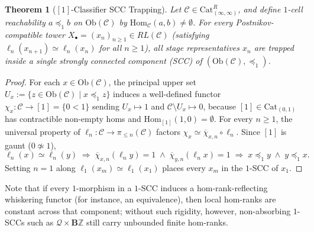 \documentclass[10pt,twoside,openright]{book}
\theoremstyle{crmplain}
\newtheorem{theorem}{Theorem}[section]
\theoremstyle{crmdef}
\theoremstyle{crmremark}
\newcommand{\lean}[1]{\ignorespaces}
\newcommand{\leanwitness}{\ignorespaces}
\begin{document}
\begin{theorem}[{$[1]$}-Classifier SCC Trapping]\label{thm:classifier-scc-trapping}%
\lean{HomotopyCRM.theorem12B_classifier_scc_trapping, HomotopyCRM.theorem12B_tower_trapped_in_single_scc}%
\leanwitness%
%
Let $\mathcal{C} \in \mathrm{Cat}^R_{(\infty, \infty)}$, and define $1$-cell reachability $a \preceq_1 b$ on $\mathrm{Ob}(\mathcal{C})$ by $\mathrm{Hom}_{\mathcal{C}}(a, b) \neq \emptyset$. For every Postnikov-compatible tower $X_\bullet = (x_n)_{n \ge 1} \in RL(\mathcal{C})$ (satisfying $\ell_n(x_{n+1}) \simeq \ell_n(x_n)$ for all $n \ge 1$), all stage representatives $x_n$ are trapped inside a single strongly connected component (SCC) of $(\mathrm{Ob}(\mathcal{C}), \preceq_1)$.
\end{theorem}

\begin{proof}
For each $x \in \mathrm{Ob}(\mathcal{C})$, the principal upper set $U_x := \{z \in \mathrm{Ob}(\mathcal{C}) \mid x \preceq_1 z\}$ induces a well-defined functor $\chi_x : \mathcal{C} \to [1] = \{0 < 1\}$ sending $U_x \mapsto 1$ and $\mathcal{C} \setminus U_x \mapsto 0$, because $[1] \in \mathrm{Cat}_{(0,1)}$ has contractible non-empty homs and $\mathrm{Hom}_{[1]}(1, 0) = \emptyset$. For every $n \ge 1$, the universal property of $\ell_n : \mathcal{C} \to \pi_{\le n}(\mathcal{C})$ factors $\chi_x \simeq \overline{\chi}_{x,n} \circ \ell_n$. Since $[1]$ is gaunt ($0 \not\simeq 1$),
\[
  \ell_n(x) \simeq \ell_n(y) \;\Longrightarrow\; \overline{\chi}_{x,n}(\ell_n y) = 1 \;\wedge\; \overline{\chi}_{y,n}(\ell_n x) = 1 \;\Longrightarrow\; x \preceq_1 y \;\wedge\; y \preceq_1 x.
\]
Setting $n = 1$ along $\ell_1(x_m) \simeq \ell_1(x_1)$ places every $x_m$ in the $1$-SCC of $x_1$.
\end{proof}
\noindent Note that if every $1$-morphism in a $1$-SCC induces a hom-rank-reflecting whiskering functor (for instance, an equivalence), then local hom-ranks are constant across that component; without such rigidity, however, non-absorbing $1$-SCCs such as $\mathcal{Q} \times \mathbf{B}\mathbb{Z}$ still carry unbounded finite hom-ranks.
\end{document}
